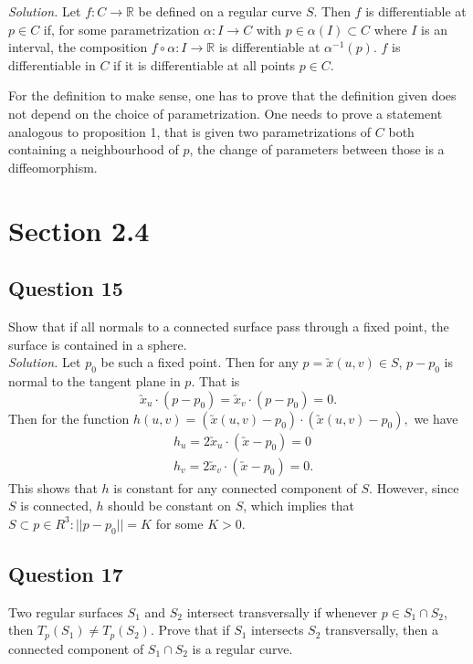 \documentclass[12pt]{article}
\begin{document}
\emph{Solution.}
Let \(f: C\to \mathbb{R}\) be defined on a regular curve \(S\).
Then \(f\) is differentiable at \(p\in C\) if,
for some parametrization \(\alpha: I\to C\) with \(p\in \alpha(I)\subset C\) where \(I\) is an interval,
the composition \(f\circ \alpha: I\to \mathbb{R}\) is differentiable at \(\alpha^{-1}(p)\).
\(f\) is differentiable in \(C\) if it is differentiable at all points \(p\in C\).

For the definition to make sense, one has to prove that the definition given does not depend on the choice of parametrization.
One needs to prove a statement analogous to proposition 1, that is given two parametrizations of \(C\) both containing a neighbourhood of \(p\),
the change of parameters between those is a diffeomorphism.

\section{Section 2.4}

\subsection*{Question 15}
Show that if all normals to a connected surface pass through a fixed point, the surface is contained in a sphere.\\

\textit{Solution.} Let $p_0$ be such a fixed point. Then for any $p = \utilde{x}(u,v)\in S$, $p-p_0$ is normal to the tangent plane in $p$. That is \begin{equation*}
    \utilde{x}_u\cdot (p-p_0) = \utilde{x}_v\cdot (p-p_0) = 0.
\end{equation*}
Then for the function $h(u,v)=(\utilde{x}(u,v)-p_0)\cdot(\utilde{x}(u,v)-p_0),$ we have \begin{align*}
    &h_u = 2\utilde{x}_u\cdot (\utilde{x}-p_0) = 0\\
    &h_v = 2\utilde{x}_v\cdot (\utilde{x}-p_0) = 0.
\end{align*}
This shows that $h$ is constant for any connected component of $S$. However, since $S$ is connected, $h$ should be constant on $S$, which implies that $S\subset {p\in R^3:||p-p_0|| = K}$ for some $K>0$.

\subsection*{Question 17}

Two regular surfaces $S_1$ and $S_2$ intersect transversally if whenever $p \in S_1 \cap S_2$,
then $T_p(S_1) \neq T_p(S_2)$. Prove that if $S_1$ intersects $S_2$ transversally,
then a connected component of $S_1 \cap S_2$ is a regular curve.
\end{document}
